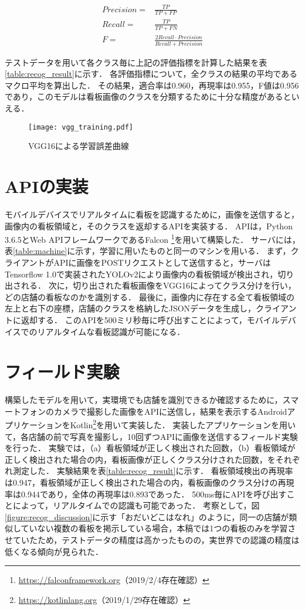     \begin{align}
      Precision = &\frac{TP}{TP+FP} \\
      Recall = &\frac{TP}{TP+FN} \\
      F = &\frac{2 Recall \cdot Precision}{Recall + Precision}
    \end{align}
    
    テストデータを用いて各クラス毎に上記の評価指標を計算した結果を表\ref{table:recog_result}に示す．
    各評価指標について，全クラスの結果の平均であるマクロ平均を算出した．
    その結果，適合率は0.960，再現率は0.955，F値は0.956であり，このモデルは看板画像のクラスを分類するために十分な精度があるといえる．

    \begin{figure}[tb]
      \centerline{\texttt{[image: vgg\_training.pdf]}}
      \caption{VGG16による学習誤差曲線}
      \label{figure:vgg_training}
    \end{figure}

\section{APIの実装}
  モバイルデバイスでリアルタイムに看板を認識するために，画像を送信すると，画像内の看板領域と，そのクラスを返却するAPIを実装する．
  APIは，Python 3.6.5とWeb APIフレームワークであるFalcon \footnote{\url{https://falconframework.org}（2019/2/4存在確認）}を用いて構築した．
  サーバには，表\ref{table:machine}に示す，学習に用いたものと同一のマシンを用いる．
  まず，クライアントがAPIに画像をPOSTリクエストとして送信すると，サーバはTensorflow 1.0\cite{Abadi:2016}で実装されたYOLOv2により画像内の看板領域が検出され，切り出される．
  次に，切り出された看板画像をVGG16によってクラス分けを行い，どの店舗の看板なのかを識別する．
  最後に，画像内に存在する全て看板領域の左上と右下の座標，店舗のクラスを格納したJSONデータを生成し，クライアントに返却する．
  このAPIを500ミリ秒毎に呼び出すことによって，モバイルデバイスでのリアルタイムな看板認識が可能になる．

\section{フィールド実験}
  構築したモデルを用いて，実環境でも店舗を識別できるか確認するために，スマートフォンのカメラで撮影した画像をAPIに送信し，結果を表示するAndroidアプリケーションをKotlin\footnote{\url{https://kotlinlang.org}（2019/1/29存在確認）}を用いて実装した．
  実装したアプリケーションを用いて，各店舗の前で写真を撮影し，10回ずつAPIに画像を送信するフィールド実験を行った．
  実験では，（a）看板領域が正しく検出された回数，（b）看板領域が正しく検出された場合の内，看板画像が正しくクラス分けされた回数，をそれぞれ測定した．
  実験結果を表\ref{table:recog_result}に示す．
  看板領域検出の再現率は0.947，看板領域が正しく検出された場合の内，看板画像のクラス分けの再現率は0.944であり，全体の再現率は0.893であった．
  500ms毎にAPIを呼び出すことによって，リアルタイムでの認識も可能であった．
  考察として，図\ref{figure:recog_discussion}に示す「おだいどこはなれ」のように，同一の店舗が類似していない複数の看板を掲示している場合，本稿では1つの看板のみを学習させていたため，テストデータの精度は高かったものの，実世界での認識の精度は低くなる傾向が見られた．

